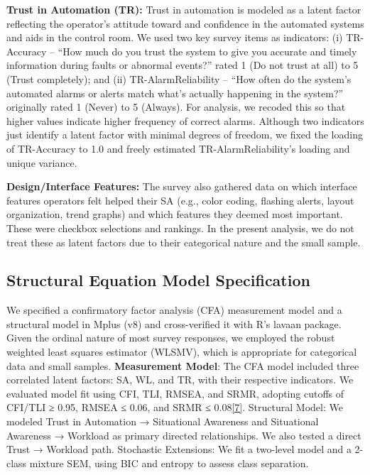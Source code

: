 \documentclass[conference]{IEEEtran}
\begin{document}
\textbf{Trust in Automation (TR):} Trust in automation is modeled as a latent factor reflecting the operator’s attitude toward and confidence in the automated systems and aids in the control room. We used two key survey items as indicators: (i) TR-Accuracy – “How much do you trust the system to give you accurate and timely information during faults or abnormal events?” rated 1 (Do not trust at all) to 5 (Trust completely); and (ii) TR-AlarmReliability – “How often do the system’s automated alarms or alerts match what’s actually happening in the system?” originally rated 1 (Never) to 5 (Always). For analysis, we recoded this so that higher values indicate higher frequency of correct alarms. Although two indicators just identify a latent factor with minimal degrees of freedom, we fixed the loading of TR-Accuracy to 1.0 and freely estimated TR-AlarmReliability’s loading and unique variance.

\textbf{Design/Interface Features:} The survey also gathered data on which interface features operators felt helped their SA (e.g., color coding, flashing alerts, layout organization, trend graphs) and which features they deemed most important. These were checkbox selections and rankings. In the present analysis, we do not treat these as latent factors due to their categorical nature and the small sample.

\subsection{Structural Equation Model Specification}
We specified a confirmatory factor analysis (CFA) measurement model and a structural model in Mplus (v8) and cross-verified it with R’s lavaan package. Given the ordinal nature of most survey responses, we employed the robust weighted least squares estimator (WLSMV), which is appropriate for categorical data and small samples. 
\textbf{Measurement Model}: The CFA model included three correlated latent factors: SA, WL, and TR, with their respective indicators. We evaluated model fit using CFI, TLI, RMSEA, and SRMR, adopting cutoffs of CFI/TLI ≥ 0.95, RMSEA ≤ 0.06, and SRMR ≤ 0.08\href{https://www.tandfonline.com/doi/abs/10.1080/10705519909540118}{[7]}. Structural Model: We modeled Trust in Automation → Situational Awareness and Situational Awareness → Workload as primary directed relationships. We also tested a direct Trust → Workload path. Stochastic Extensions: We fit a two-level model and a 2-class mixture SEM, using BIC and entropy to assess class separation.
\end{document}
